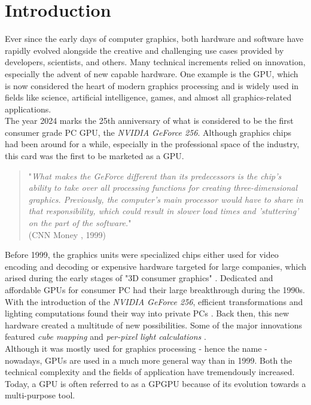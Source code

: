 \chapter{Introduction} \label{cpt-introduction}

Ever since the early days of computer graphics, both hardware and software have rapidly evolved
alongside the creative and challenging use cases provided by developers, scientists, and others.
Many technical increments relied on innovation, especially the advent of new capable hardware.
One example is the \ac{GPU}, which is now considered the heart of modern graphics 
processing and is widely used in fields like science, artificial intelligence, games, and almost  
all graphics-related applications. \\

\noindent
The year 2024 marks the 25th anniversary of what is considered to be the first consumer grade PC 
\ac{GPU}, the \emph{NVIDIA GeForce 256}. Although graphics chips had been around for a while, 
especially in the professional space of the industry, this card was the first to be marketed 
as a \ac{GPU}. 

\begin{quote}
    "\emph{What makes the GeForce different than its predecessors is the chip's ability to take over all 
    processing functions for creating three-dimensional graphics. Previously, the computer's main 
    processor would have to share in that responsibility, which could result in slower load times 
    and 'stuttering' on the part of the software.}" \\  
    (CNN Money \cite{CNNMoney1999}, 1999)
\end{quote}

\noindent
Before 1999, the graphics units were specialized chips either used for video encoding and decoding
or expensive hardware targeted for large companies, which arised during the early stages of "3D 
consumer graphics" \cite{Singer2023}. Dedicated and affordable \ac{GPU}s for consumer \ac{PC} had 
their large breakthrough during the 1990s. With the introduction of the \emph{NVIDIA GeForce 256}, 
efficient transformations and lighting computations found their way into private \ac{PC}s 
\cite{Fenno2024}. Back then, this new hardware created a multitude of new possibilities. Some of the 
major innovations featured \emph{cube mapping} and \emph{per-pixel light calculations} 
\cite{NVIDIA1999, Battaglia2024}.\\

\noindent
Although it was mostly used for graphics processing - hence the name - nowadays, \ac{GPU}s are used 
in a much more general way than in 1999. Both the technical complexity and the fields of application 
have tremendously increased. Today, a \ac{GPU} is often referred to as a \ac{GPGPU} because of its 
evolution towards a multi-purpose tool. \\

